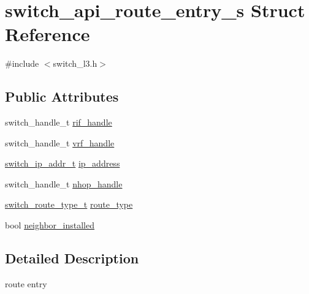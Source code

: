 \hypertarget{structswitch__api__route__entry__s}{\section{switch\+\_\+api\+\_\+route\+\_\+entry\+\_\+s Struct Reference}
\label{structswitch__api__route__entry__s}
}


{\ttfamily \#include $<$switch\+\_\+l3.\+h$>$}

\subsection*{Public Attributes}
\begin{DoxyCompactItemize}
\item 
switch\+\_\+handle\+\_\+t \hyperlink{structswitch__api__route__entry__s_ad57d791b55cf36a78198799c1c4ccae7}{rif\+\_\+handle}
\item 
switch\+\_\+handle\+\_\+t \hyperlink{structswitch__api__route__entry__s_a6237f02132fe809a71ef0d87868159e0}{vrf\+\_\+handle}
\item 
\hyperlink{structswitch__ip__addr__s}{switch\+\_\+ip\+\_\+addr\+\_\+t} \hyperlink{structswitch__api__route__entry__s_ab7f90a773f25b3c16c9357746fdde489}{ip\+\_\+address}
\item 
switch\+\_\+handle\+\_\+t \hyperlink{structswitch__api__route__entry__s_ae9751dbc581309ad2eaa117c2dcf1ad3}{nhop\+\_\+handle}
\item 
\hyperlink{group__L3_gabfc821b0610bd242ad0a4aba5f152280}{switch\+\_\+route\+\_\+type\+\_\+t} \hyperlink{structswitch__api__route__entry__s_abc9dc6b0ceda58ceb7181cc1a5174b6d}{route\+\_\+type}
\item 
bool \hyperlink{structswitch__api__route__entry__s_a7b7ba2edba54564b6d4531c9b7640051}{neighbor\+\_\+installed}
\end{DoxyCompactItemize}


\subsection{Detailed Description}
route entry 

